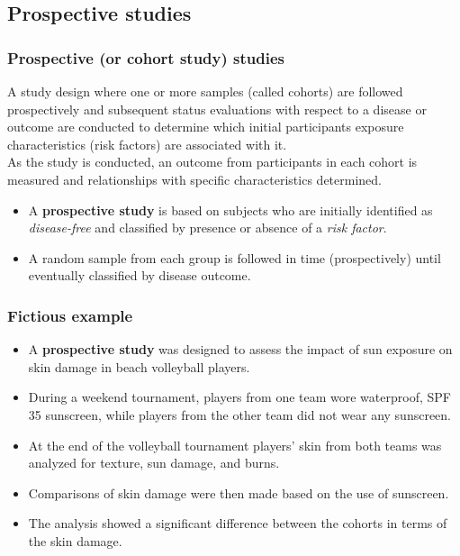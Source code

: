 \documentclass[a4paper]{article}\usepackage[]{graphicx}\usepackage[]{xcolor}
\begin{document}
\subsection{Prospective studies}
\subsubsection{Prospective (or cohort study) studies}
A study design where one or more samples (called cohorts) are followed prospectively and subsequent status evaluations with respect to a disease or outcome are conducted to determine which initial participants exposure characteristics (risk factors) are associated with it.\\
As the study is conducted, an outcome from participants in each cohort is measured and relationships with specific characteristics determined.
\begin{goldbox}
\begin{itemize}
	\item A \textbf{prospective study} is based on subjects who are initially identified as \textit{disease-free} and classified by presence or absence of a \textit{risk factor}.
	\item A random sample from each group is followed in time (prospectively) until eventually classified by disease outcome.
\end{itemize}
\end{goldbox}
\subsubsection{Fictious example}
\begin{itemize}
	\item A \textbf{prospective study }was designed to assess the impact of sun exposure on skin damage in beach volleyball players.
	\item During a weekend tournament, players from one team wore waterproof, SPF 35 sunscreen, while players from the other team did not wear any sunscreen.
	\item At the end of the volleyball tournament players' skin from both teams was analyzed for texture, sun damage, and burns.
	\item Comparisons of skin damage were then made based on the use of sunscreen.
	\item The analysis showed a significant difference between the cohorts in terms of the skin damage.
\end{itemize}
\end{document}
